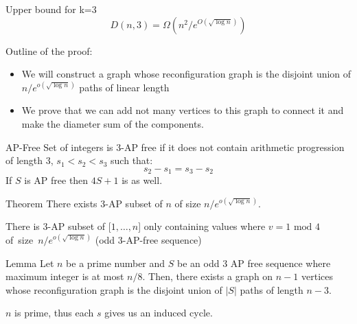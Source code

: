 \begin{frame}
    \begin{theorem}{Upper bound for k=3}
        \[D(n,3)=\Omega(n^2/e^{O(\sqrt{\log n})})\]
    \end{theorem}
    \begin{heading}{Outline of the proof:}
    \begin{itemize}
        \item We will construct a graph whose reconfiguration graph is the disjoint union of \(n/e^{o(\sqrt{\log n})}\) paths of linear length
        \item We prove that we can add not many vertices to this graph to connect it and make the diameter sum of the components.
    \end{itemize}
    \end{heading}
\end{frame}


\begin{frame}{AP-Free}
    Set of integers is 3-AP free if it does not contain arithmetic progression of length 3, \(s_1<s_2<s_3\) such that:
    \[s_2-s_1=s_3-s_2\]
    If \(S\) is AP free then \(4S+1\) is as well.\\
    \pause
    \begin{theorem}{Theorem}
        There exists 3-AP subset of \(n\) of size \(n/e^{o(\sqrt{\log n})}\). \framemark
    \end{theorem}
    There is 3-AP subset of [\(1,\dots,n\)] only containing values where \(v=1 \text{ mod } 4\) of~size~\(n/e^{o(\sqrt{\log n})}\) (odd 3-AP-free sequence)
\end{frame}


\begin{frame}
\begin{lemma}{Lemma}
    Let \(n\) be a prime number and \(S\) be an odd 3 AP free sequence where maximum integer is at most \(n/8\). Then, there exists a graph on \(n-1\) vertices whose reconfiguration graph is the disjoint union of \(|S|\) paths of length \(n-3\).
\end{lemma}
\begin{figure}
    \centering
    
\end{figure}
\pause
 \(n\) is prime, thus each \(s\) gives us an induced cycle.
\end{frame}

